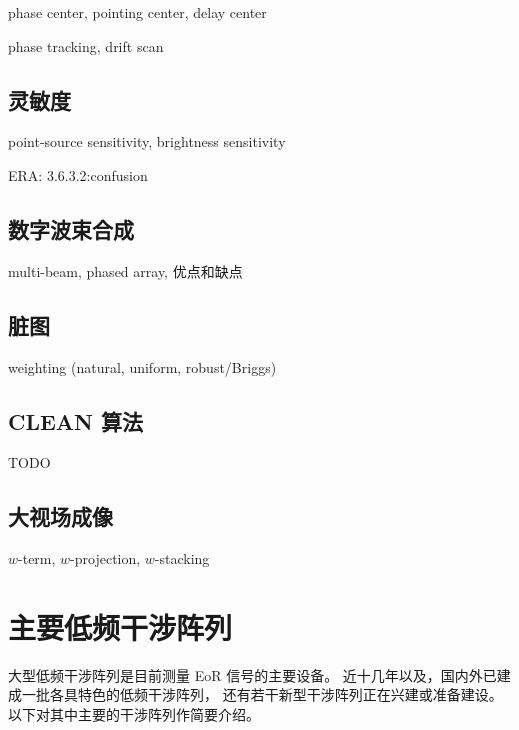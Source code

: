 phase center, pointing center, delay center

phase tracking, drift scan

\subsection{灵敏度}

point-source sensitivity, brightness sensitivity

ERA: 3.6.3.2:confusion

\subsection{数字波束合成}

multi-beam, phased array, 优点和缺点

\subsection{脏图}

weighting (natural, uniform, robust/Briggs)

\subsection{CLEAN 算法}

TODO

\subsection{大视场成像}

$w$-term, $w$-projection, $w$-stacking


\section{主要低频干涉阵列}
\label{sec:instruments}

大型低频干涉阵列是目前测量 EoR 信号的主要设备。
近十几年以及，国内外已建成一批各具特色的低频干涉阵列，
还有若干新型干涉阵列正在兴建或准备建设。
以下对其中主要的干涉阵列作简要介绍。

